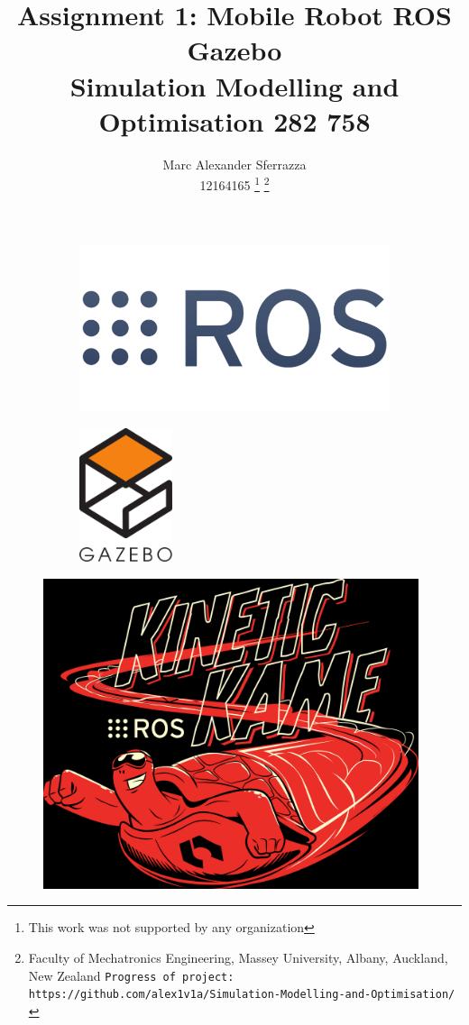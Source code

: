 \documentclass[a4paper, 10pt]{IEEEconf}
\title{\LARGE \bf Assignment 1: Mobile Robot ROS Gazebo\\Simulation Modelling and Optimisation 282 758}
\author{Marc Alexander Sferrazza \\ 12164165
\thanks{This work was not supported by any organization}
\thanks{Faculty of Mechatronics Engineering, Massey University, Albany, Auckland, New Zealand
        {\tt\small Progress of project: https://github.com/alex1v1a/Simulation-Modelling-and-Optimisation/} } }
\begin{document}
\maketitle
\begin{figure}[h]
\begin{subfigure}{0.5\textwidth}
\includegraphics[width=1.5\textwidth, left]{images/ROS} 
\label{fig:ROS}
\end{subfigure}
\begin{subfigure}{0.5\textwidth}
\includegraphics[width=0.3\textwidth, right]{images/gazebo}
\label{fig:Gazebo}
\end{subfigure}
\end{figure}
\begin{figure}[H]
  \begin{center}
  \includegraphics[width=110mm]{images/kinetic}
  \label{fig:kinetic}
  \end{center}
\end{figure}
\thispagestyle{empty}
\pagestyle{plain}
\end{document}
